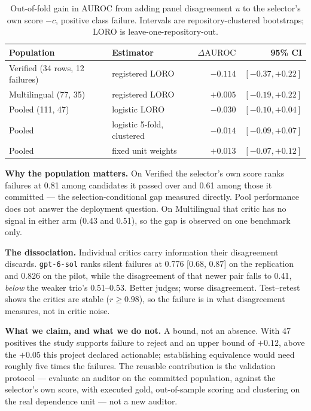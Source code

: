\documentclass[11pt,a4paper]{article}
\newcommand{\DeltaAUROC}{\Delta\mathrm{AUROC}}
\begin{document}
\begin{table}[h]\centering\small
\begin{tabular}{llrr}\toprule
Population & Estimator & $\DeltaAUROC$ & 95\% CI \\\midrule
Verified (34 rows, 12 failures) & registered LORO & $-0.114$ & $[-0.37, +0.22]$ \\
Multilingual (77, 35) & registered LORO & $+0.005$ & $[-0.19, +0.22]$ \\
Pooled (111, 47) & logistic LORO & $-0.030$ & $[-0.10, +0.04]$ \\
Pooled & logistic 5-fold, clustered & $-0.014$ & $[-0.09, +0.07]$ \\
Pooled & fixed unit weights & $+0.013$ & $[-0.07, +0.12]$ \\\bottomrule
\end{tabular}
\caption{Out-of-fold gain in AUROC from adding panel disagreement $u$ to the selector's own score $-c$, positive class failure. Intervals are repository-clustered bootstraps; LORO is leave-one-repository-out.}\label{tab:gains}
\end{table}

\textbf{Why the population matters.} On Verified the selector's own score ranks failures at 0.81 among candidates it passed over and 0.61 among those it committed --- the selection-conditional gap measured directly. Pool performance does not answer the deployment question. On Multilingual that critic has no signal in either arm (0.43 and 0.51), so the gap is observed on one benchmark only.

\textbf{The dissociation.} Individual critics carry information their disagreement discards. \texttt{gpt-6-sol} ranks silent failures at 0.776 [0.68, 0.87] on the replication and 0.826 on the pilot, while the disagreement of that newer pair falls to 0.41, \emph{below} the weaker trio's 0.51--0.53. Better judges; worse disagreement. Test--retest shows the critics are stable ($r\geq0.98$), so the failure is in what disagreement measures, not in critic noise.

\textbf{What we claim, and what we do not.} A bound, not an absence. With 47 positives the study supports failure to reject and an upper bound of $+0.12$, above the $+0.05$ this project declared actionable; establishing equivalence would need roughly five times the failures. The reusable contribution is the validation protocol --- evaluate an auditor on the committed population, against the selector's own score, with executed gold, out-of-sample scoring and clustering on the real dependence unit --- not a new auditor.
\end{document}
